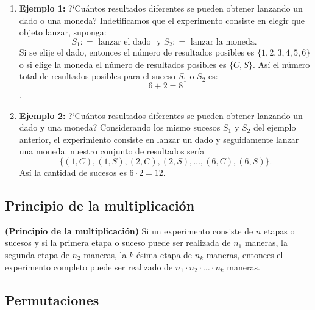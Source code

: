\begin{example}
    \hspace{0mm}
    \begin{enumerate}[{\rm 1}]
        \item {\bf Ejemplo 1:}  ?`Cu\'antos resultados diferentes se pueden obtener lanzando un dado o una moneda?
              Indetificamos que el experimento consiste en elegir que objeto lanzar, suponga:
              $$ S_1\colon = \text{ lanzar el dado } \text{ y } S_2 \colon = \text{ lanzar la moneda. }$$
              Si se elije el dado, entonces el n\'umero de resultados posibles es $\{1,2,3,4,5,6\}$ o
              si elige la moneda el n\'umero de resultados posibles es $\{C,S\}$.
              As\'i el n\'umero total de resultados posibles para el suceso $S_1$ o $S_2$ es: $$6+2=8$$.
        \item {\bf Ejemplo 2:}  ?`Cu\'antos resultados diferentes se pueden obtener lanzando un dado y una moneda?
              Considerando los mismo sucesos $S_1$ y $S_2$ del ejemplo anterior, el experimiento consiste en lanzar un dado y seguidamente lanzar una moneda.
              nuestro conjunto de resultados ser\'ia
              $$ \{ {(1,C), (1,S)}, (2,C), (2,S), \ldots, (6,C), (6,S) \}. $$
              As\'i la cantidad de sucesos es $6\cdot2 = 12.$
    \end{enumerate}
\end{example}

\subsection{Principio de la multiplicaci\'on}
\begin{definition}{\bf (Principio de la multiplicaci\'on)}
    Si un experimento consiste de $n$ etapas o sucesos y si la primera etapa o suceso puede ser realizada de $n_{1}$ maneras, la segunda
    etapa de $n_{2}$ maneras, la $k$-\'esima etapa de $n_{k}$ maneras, entonces el experimento completo puede ser realizado
    de $n_{1}\cdot n_{2}\cdot\ldots\cdot n_{k}$ maneras.
\end{definition}

\subsection{Permutaciones}

